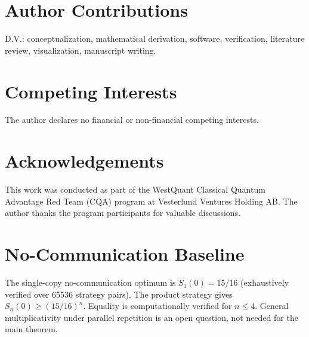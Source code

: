 \documentclass[11pt,letterpaper]{article}
\begin{document}
\section*{Author Contributions}

D.V.: conceptualization, mathematical derivation, software, verification, literature review, visualization, manuscript writing.

\section*{Competing Interests}

The author declares no financial or non-financial competing interests.

\section*{Acknowledgements}

This work was conducted as part of the WestQuant Classical Quantum Advantage Red Team (CQA) program at Vesterlund Ventures Holding AB. The author thanks the program participants for valuable discussions.

\appendix

\section{No-Communication Baseline}
\label{app:nocomm}

The single-copy no-communication optimum is $S_1(0) = 15/16$ (exhaustively verified over 65536 strategy pairs). The product strategy gives $S_n(0) \geq (15/16)^n$. Equality is computationally verified for $n \leq 4$. General multiplicativity under parallel repetition is an open question, not needed for the main theorem.
\end{document}
